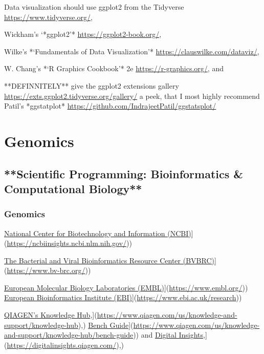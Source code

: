 \documentclass[
]{book}
\begin{document}
Data visualization should use ggplot2 from the Tidyverse \url{https://www.tidyverse.org/},

Wickham's `*ggplot2'* \url{https://ggplot2-book.org/},

Wilke's *`Fundamentals of Data Visualization'* \url{https://clauswilke.com/dataviz/},

W. Chang's *`R Graphics Cookbook'* 2e \url{https://r-graphics.org/}, and

**DEFINNITELY** give the ggplot2 extensions gallery \url{https://exts.ggplot2.tidyverse.org/gallery/} a peek, that I most highly recommend Patil's *ggstatplot* \url{https://github.com/IndrajeetPatil/ggstatsplot/}

\chapter{Genomics}\label{genomics}

\section{**Scientific Programming: Bioinformatics \& Computational Biology**}\label{scientific-programming-bioinformatics-computational-biology}

\subsection{Genomics}\label{genomics-1}

\href{\%5Bhttps://ncbiinsights.ncbi.nlm.nih.gov/}{National Center for Biotechnology and Information (NCBI)}{]}(\url{https://ncbiinsights.ncbi.nlm.nih.gov/}))

\href{\%5Bhttps://www.bv-brc.org/}{The Bacterial and Viral Bioinformatics Resource Center (BVBRC)}{]}(\url{https://www.bv-brc.org/}))

\href{\%5Bhttps://www.embl.org/}{European Molecular Biology Laboratories (EMBL)}{]}(\url{https://www.embl.org/})) \href{\%5Bhttps://www.ebi.ac.uk/research}{European Bioinformatics Institute (EBI)}{]}(\url{https://www.ebi.ac.uk/research}))

\href{\%5Bhttps://www.qiagen.com/us/knowledge-and-support/knowledge-hub}{QIAGEN's Knowledge Hub},{]}(\url{https://www.qiagen.com/us/knowledge-and-support/knowledge-hub}),) \href{\%5Bhttps://www.qiagen.com/us/knowledge-and-support/knowledge-hub/bench-guide}{Bench Guide}{]}(\url{https://www.qiagen.com/us/knowledge-and-support/knowledge-hub/bench-guide})) and \href{\%5Bhttps://digitalinsights.qiagen.com/}{Digital Insights},{]}(\url{https://digitalinsights.qiagen.com/}),)
\end{document}
